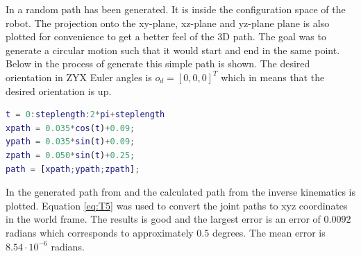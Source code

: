 In  a random path has been generated. It is inside the configuration space of the robot. The projection onto the xy-plane, xz-plane and yz-plane plane is also plotted for convenience to get a better feel of the 3D path. The goal was to generate a circular motion such that it would start and end in the same point. Below in  the process of generate this simple path is shown. The desired orientation in ZYX Euler angles is $o_d = [0,0,0]^T$ which in means that the desired orientation is up.
\begin{lstlisting}[caption={MATLAB code for creating path},label={lst:path},language=Matlab]
t = 0:steplength:2*pi+steplength
xpath = 0.035*cos(t)+0.09;
ypath = 0.035*sin(t)+0.09;
zpath = 0.050*sin(t)+0.25;
path = [xpath;ypath;zpath];
\end{lstlisting}
In  the generated path from  and the calculated path from the inverse kinematics is plotted. Equation \eqref{eq:T5} was used to convert the joint paths to xyz coordinates in the world frame. The results is good and the largest error is an error of $0.0092$ radians which corresponds to approximately $0.5$ degrees. The mean error is $8.54\cdot10^{-6}$ radians. 
\def\picsSiz{1.08}
